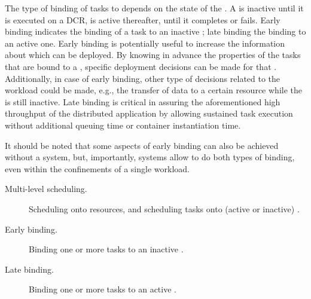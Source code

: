 \documentclass{sig-alternate}
\begin{document}
The type of binding of tasks to \pilots depends on the state of the \pilot. A
\pilot is inactive until it is executed on a DCR, is active thereafter, until it
completes or fails.  Early binding indicates the binding of a task to an
inactive \pilot; late binding the binding to an active one. Early binding is
potentially useful to increase the information about which \pilots can be
deployed. By knowing in advance the properties of the tasks that are bound to a
\pilot, specific deployment decisions can be made for that \pilot.
Additionally, in case of early binding, other type of decisions related to the
workload could be made, e.g., the transfer of data to a certain resource while
the \pilot is still inactive. Late binding is critical in assuring the
aforementioned high throughput of the distributed application by allowing
sustained task execution without additional queuing time or container
instantiation time.

It should be noted that some aspects of early binding can also be achieved
without a \pilot system, but, importantly, \pilot systems allow to do both types
of binding, even within the confinements of a single workload.  


\begin{description}

\item[Multi-level scheduling.] Scheduling \pilots onto resources, and
scheduling tasks onto (active or inactive) \pilots.

\item[Early binding.] Binding one or more tasks to an inactive \pilot.

\item[Late binding.] Binding one or more tasks to an active \pilot.

\end{description}


\end{document}
